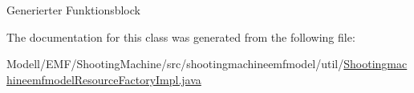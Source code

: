 Generierter Funktionsblock 

The documentation for this class was generated from the following file\-:\begin{DoxyCompactItemize}
\item 
Modell/\-E\-M\-F/\-Shooting\-Machine/src/shootingmachineemfmodel/util/\hyperlink{_shootingmachineemfmodel_resource_factory_impl_8java}{Shootingmachineemfmodel\-Resource\-Factory\-Impl.\-java}\end{DoxyCompactItemize}
